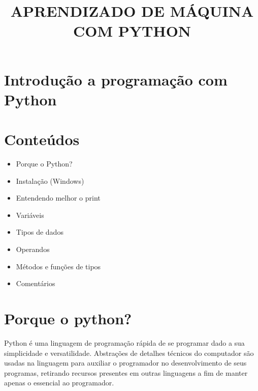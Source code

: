 \documentclass[
  letterpaper,
  DIV=11,
  numbers=noendperiod]{scrreprt}
\title{APRENDIZADO DE MÁQUINA COM PYTHON}
\author{}
\date{}
\providecommand{\tightlist}{%
  \setlength{\itemsep}{0pt}\setlength{\parskip}{0pt}}\usepackage{longtable,booktabs,array}
\renewcommand*\contentsname{Table of contents}
\newcommand\contentsname{Table of contents}
\begin{document}
\maketitle
\ifdefined\Shaded\renewenvironment{Shaded}{\begin{tcolorbox}[breakable, borderline west={3pt}{0pt}{shadecolor}, frame hidden, interior hidden, enhanced, sharp corners, boxrule=0pt]}{\end{tcolorbox}}\fi

\renewcommand*\contentsname{Navegação}
{
\hypersetup{linkcolor=}
\setcounter{tocdepth}{2}
\tableofcontents
}

\hypertarget{introduuxe7uxe3o-a-programauxe7uxe3o-com-python}{%
\chapter{Introdução a programação com
Python}\label{introduuxe7uxe3o-a-programauxe7uxe3o-com-python}}


\hypertarget{conteuxfados}{%
\chapter{Conteúdos}\label{conteuxfados}}

\begin{itemize}
\tightlist
\item
  Porque o Python?
\item
  Instalação (Windows)
\item
  Entendendo melhor o print
\item
  Variáveis
\item
  Tipos de dados
\item
  Operandos
\item
  Métodos e funções de tipos
\item
  Comentários
\end{itemize}


\hypertarget{porque-o-python}{%
\chapter{Porque o python?}\label{porque-o-python}}

Python é uma linguagem de programação rápida de se programar dado a sua
simplicidade e versatilidade. Abstrações de detalhes técnicos do
computador são usadas na linguagem para auxiliar o programador no
desenvolvimento de seus programas, retirando recursos presentes em
outras linguagens a fim de manter apenas o essencial ao programador.
\end{document}
